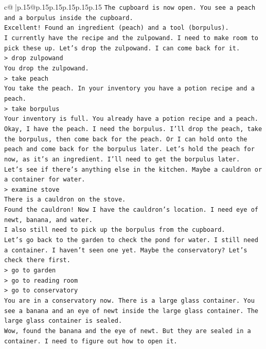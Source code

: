\documentclass{article}
\begin{document}
{\begin{supertabular}{c@{$\;$}|p{.15\linewidth}@{}p{.15\linewidth}p{.15\linewidth}p{.15\linewidth}p{.15\linewidth}p{.15\linewidth}}
{{{\texttt{The cupboard is now open. You see a peach and a borpulus inside the cupboard.} \\
\texttt{Excellent! Found an ingredient (peach) and a tool (borpulus).} \\
\texttt{I currently have the recipe and the zulpowand. I need to make room to pick these up. Let's drop the zulpowand. I can come back for it.} \\
\texttt{> drop zulpowand} \\
\texttt{You drop the zulpowand.} \\
\texttt{> take peach} \\
\texttt{You take the peach. In your inventory you have a potion recipe and a peach.} \\
\texttt{> take borpulus} \\
\texttt{Your inventory is full. You already have a potion recipe and a peach.} \\
\texttt{Okay, I have the peach. I need the borpulus. I'll drop the peach, take the borpulus, then come back for the peach. Or I can hold onto the peach and come back for the borpulus later. Let's hold the peach for now, as it's an ingredient. I'll need to get the borpulus later.} \\
\texttt{Let's see if there's anything else in the kitchen. Maybe a cauldron or a container for water.} \\
\texttt{> examine stove} \\
\texttt{There is a cauldron on the stove.} \\
\texttt{Found the cauldron! Now I have the cauldron's location. I need eye of newt, banana, and water.} \\
\texttt{I also still need to pick up the borpulus from the cupboard.} \\
\texttt{Let's go back to the garden to check the pond for water. I still need a container. I haven't seen one yet. Maybe the conservatory? Let's check there first.} \\
\texttt{> go to garden} \\
\texttt{> go to reading room} \\
\texttt{> go to conservatory} \\
\texttt{You are in a conservatory now. There is a large glass container. You see a banana and an eye of newt inside the large glass container. The large glass container is sealed.} \\
\texttt{Wow, found the banana and the eye of newt. But they are sealed in a container. I need to figure out how to open it.} \\
}}}
\end{supertabular}}
\end{document}
